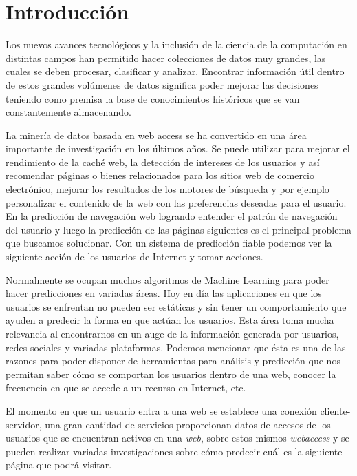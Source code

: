 \chapter[Introducción]{Introducción}
\label{ch:intro}

{
Los nuevos avances tecnológicos y la inclusión de la ciencia de la computación en distintas campos han permitido hacer colecciones de datos muy grandes, las cuales se deben procesar, clasificar y analizar. Encontrar información útil dentro de estos grandes volúmenes de datos significa poder mejorar las decisiones teniendo como premisa la base de conocimientos históricos que se van constantemente almacenando.

La minería de datos basada en web access se ha convertido en una área importante de investigación en los últimos años. Se puede utilizar para mejorar el rendimiento de la caché web, la detección de intereses de los usuarios y así recomendar páginas o bienes relacionados para los sitios web de comercio electrónico, mejorar los resultados de los motores de búsqueda y por ejemplo personalizar el contenido de la web con las preferencias deseadas para el usuario. En la predicción de navegación web logrando entender el patrón de navegación del usuario y luego la predicción de las páginas siguientes es el principal problema que buscamos solucionar. Con un sistema de predicción fiable podemos ver la siguiente acción de los usuarios de Internet y tomar acciones. 


Normalmente se ocupan muchos algoritmos de Machine Learning para poder hacer predicciones en variadas áreas. Hoy en día las aplicaciones en que los usuarios se enfrentan no pueden ser estáticas y sin tener un comportamiento que ayuden a predecir la forma en que actúan los usuarios. Esta área toma mucha relevancia al encontrarnos en un auge de la información generada por usuarios, redes sociales y variadas plataformas. Podemos mencionar que ésta es una de las razones para poder disponer de herramientas para análisis y predicción que nos permitan saber cómo se comportan los usuarios dentro de una web, conocer la frecuencia en que se accede a un recurso en Internet, etc. 

El momento en que un usuario entra a una web se establece una conexión cliente-servidor, una gran cantidad de servicios proporcionan datos de accesos de los usuarios que se encuentran activos en una \emph{web}, sobre estos mismos \emph{webaccess} y se pueden realizar variadas investigaciones sobre cómo predecir cuál es la siguiente página que podrá visitar. 


}
